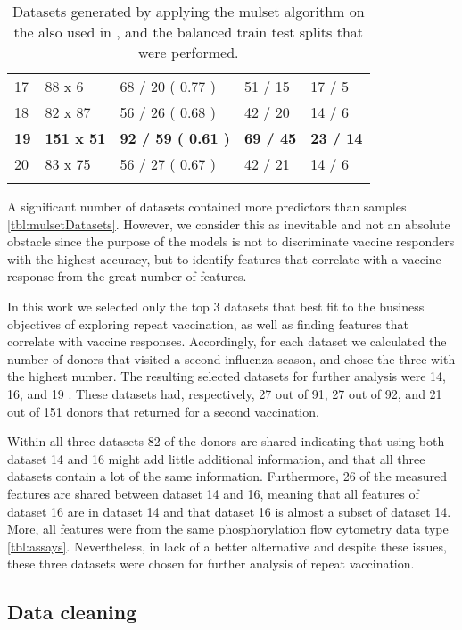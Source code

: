 \begin{table}[htpb]
\begin{tabularx}{\textwidth}{XXXXX}
17 & 88 x 6 & 68 / 20 ( 0.77 ) & 51 / 15 & 17 / 5\\
18 & 82 x 87 & 56 / 26 ( 0.68 ) & 42 / 20 & 14 / 6\\
\textbf{19} & \textbf{151 x 51} & \textbf{92 / 59 ( 0.61 )} & \textbf{69 / 45} & \textbf{23 / 14}\\
20 & 83 x 75 & 56 / 27 ( 0.67 ) & 42 / 21 & 14 / 6\\
\bottomrule{}
\end{tabularx}
    \caption{
        Datasets generated by applying the mulset algorithm on the \firstvis also used in \spaper, and the balanced train test splits that were performed.
    }\label{tbl:mulsetDatasets}
\end{table}

A significant number of datasets contained more predictors than samples \autoref{tbl:mulsetDatasets}.
However, we consider this as inevitable and not an absolute obstacle since the purpose of the models is not to discriminate vaccine responders with the highest accuracy, but to identify features that correlate with a vaccine response from the great number of features.

In this work we selected only the top 3 datasets that best fit to the business objectives of exploring repeat vaccination, as well as finding features that correlate with vaccine responses.
Accordingly, for each dataset we calculated the number of donors that visited a second influenza season, and chose the three with the highest number.
The resulting selected datasets for further analysis were 14, 16, and 19 .
These datasets had, respectively,  27 out of 91, 27 out of 92, and 21 out of 151 donors that returned for a second vaccination.

Within all three datasets 82 of the donors are shared indicating that using both dataset 14 and 16 might add little additional information, and that all three datasets contain a lot of the same information.
Furthermore, 26 of the measured features are shared between dataset 14 and 16, meaning that all features of dataset 16 are in dataset 14 and that dataset 16 is almost a subset of dataset 14.
More, all features were from the same  phosphorylation flow cytometry data type \autoref{tbl:assays}.
Nevertheless, in lack of a better alternative and despite these issues, these three datasets were chosen for further analysis of repeat vaccination.

\subsection{Data cleaning}

